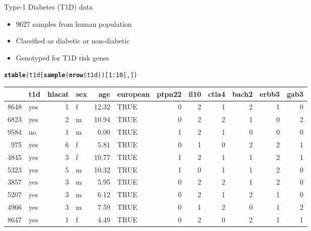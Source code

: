 \documentclass{beamer}\usepackage[]{graphicx}\usepackage[]{color}
\makeatletter
\newcommand{\hlnum}[1]{\textcolor[rgb]{0.686,0.059,0.569}{#1}}%
\newcommand{\hlopt}[1]{\textcolor[rgb]{0,0,0}{#1}}%
\newcommand{\hlstd}[1]{\textcolor[rgb]{0.345,0.345,0.345}{#1}}%
\newcommand{\hlkwd}[1]{\textcolor[rgb]{0.737,0.353,0.396}{\textbf{#1}}}%
\newenvironment{kframe}{%
 \def\at@end@of@kframe{}%
 \ifinner\ifhmode%
  \def\at@end@of@kframe{\end{minipage}}%
  \begin{minipage}{\columnwidth}%
 \fi\fi%
 \def\FrameCommand##1{\hskip\@totalleftmargin \hskip-\fboxsep
 \colorbox{shadecolor}{##1}\hskip-\fboxsep
     \hskip-\linewidth \hskip-\@totalleftmargin \hskip\columnwidth}%
 \MakeFramed {\advance\hsize-\width
   \@totalleftmargin\z@ \linewidth\hsize
   \@setminipage}}%
 {\par\unskip\endMakeFramed%
 \at@end@of@kframe}
\makeatother
\begin{document}
\begin{frame}{Type-1 Diabetes (T1D) data}
  \begin{itemize}
    \item $9627$ samples from human population
    \item Classified as diabetic or non-diabetic
    \item Genotyped for T1D risk genes
  \end{itemize}
  \tiny
\begin{kframe}
\begin{alltt}
\hlkwd{xtable}\hlstd{(t1d[}\hlkwd{sample}\hlstd{(}\hlkwd{nrow}\hlstd{(t1d))[}\hlnum{1}\hlopt{:}\hlnum{10}\hlstd{],])}
\end{alltt}
\end{kframe}%
\begin{table}[ht]
\centering
\begin{tabular}{rlrlrlrrrrrr}
  \hline
 & t1d & hlacat & sex & age & european & ptpn22 & il10 & ctla4 & bach2 & erbb3 & gab3 \\ 
  \hline
8648 & yes &   1 & f & 12.32 & TRUE &   0 &   2 &   1 &   2 &   1 &   0 \\ 
  6823 & yes &   2 & m & 10.94 & TRUE &   0 &   2 &   2 &   1 &   0 &   2 \\ 
  9584 & no &   1 & m & 0.00 & TRUE &   1 &   2 &   1 &   0 &   0 &   0 \\ 
  975 & yes &   6 & f & 5.81 & TRUE &   0 &   1 &   0 &   2 &   2 &   1 \\ 
  4845 & yes &   3 & f & 10.77 & TRUE &   1 &   2 &   1 &   1 &   2 &   1 \\ 
  5323 & yes &   5 & m & 10.32 & TRUE &   1 &   0 &   1 &   1 &   2 &   0 \\ 
  3857 & yes &   3 & m & 5.95 & TRUE &   0 &   2 &   2 &   1 &   2 &   0 \\ 
  5207 & yes &   3 & m & 6.12 & TRUE &   0 &   2 &   1 &   2 &   1 &   0 \\ 
  4966 & yes &   3 & m & 7.59 & TRUE &   0 &   1 &   2 &   0 &   1 &   2 \\ 
  8647 & yes &   1 & f & 4.49 & TRUE &   0 &   2 &   0 &   2 &   1 &   1 \\ 
   \hline
\end{tabular}
\end{table}

\end{frame}
\end{document}
